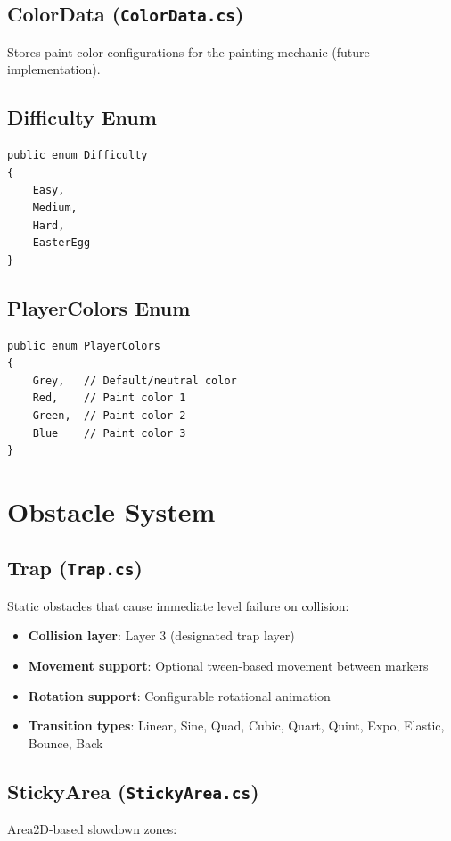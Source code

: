 \documentclass{report}
\begin{document}
\section{ColorData (\texttt{ColorData.cs})}
Stores paint color configurations for the painting mechanic (future implementation).
\pagebreak
\section{Difficulty Enum}
\begin{verbatim}
public enum Difficulty
{
    Easy,
    Medium,
    Hard,
    EasterEgg
}
\end{verbatim}

\section{PlayerColors Enum}
\begin{verbatim}
public enum PlayerColors
{
    Grey,   // Default/neutral color
    Red,    // Paint color 1
    Green,  // Paint color 2
    Blue    // Paint color 3
}
\end{verbatim}

\chapter{Obstacle System}
\section{Trap (\texttt{Trap.cs})}
Static obstacles that cause immediate level failure on collision:

\begin{itemize}[noitemsep]
	\item \textbf{Collision layer}: Layer 3 (designated trap layer)
	\item \textbf{Movement support}: Optional tween-based movement between markers
	\item \textbf{Rotation support}: Configurable rotational animation
	\item \textbf{Transition types}: Linear, Sine, Quad, Cubic, Quart, Quint, Expo, Elastic, Bounce, Back
\end{itemize}

\section{StickyArea (\texttt{StickyArea.cs})}
Area2D-based slowdown zones:
\end{document}
